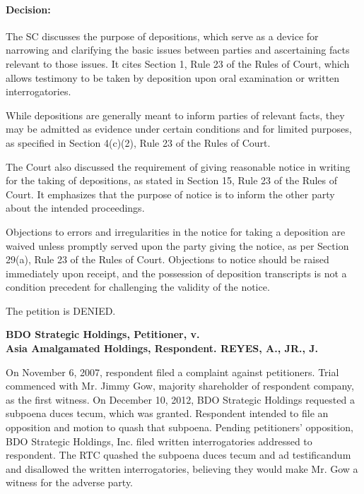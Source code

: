 \documentclass[
12pt,
oneside,
onehalfspacing,
headsepline
]{DigestCollection}
\begin{document}
\paragraph{Decision:}
\label{eec357d0-09fd-11ef-932c-63c852f65e48}


The SC discusses the purpose of depositions, which serve as a device for narrowing and clarifying the basic issues between parties and ascertaining facts relevant to those issues. It cites Section 1, Rule 23 of the Rules of Court, which allows testimony to be taken by deposition upon oral examination or written interrogatories.

While depositions are generally meant to inform parties of relevant facts, they may be admitted as evidence under certain conditions and for limited purposes, as specified in Section 4(c)(2), Rule 23 of the Rules of Court.

The Court also discussed the requirement of giving reasonable notice in writing for the taking of depositions, as stated in Section 15, Rule 23 of the Rules of Court. It emphasizes that the purpose of notice is to inform the other party about the intended proceedings.

Objections to errors and irregularities in the notice for taking a deposition are waived unless promptly served upon the party giving the notice, as per Section 29(a), Rule 23 of the Rules of Court. Objections to notice should be raised immediately upon receipt, and the possession of deposition transcripts is not a condition precedent for challenging the validity of the notice. 

The petition is DENIED. 

\label{159efc30-0a10-11ef-932c-63c852f65e48}


\noindent\textbf{BDO Strategic Holdings, Petitioner, v. \\ Asia Amalgamated Holdings, Respondent. REYES, A., JR., J.}\vspace{0.4cm}

On November 6, 2007, respondent filed a complaint against petitioners. Trial commenced with Mr. Jimmy Gow, majority shareholder of respondent company, as the first witness. On December 10, 2012, BDO Strategic Holdings requested a subpoena duces tecum, which was granted. Respondent intended to file an opposition and motion to quash that subpoena. Pending petitioners' opposition, BDO Strategic Holdings, Inc. filed written interrogatories addressed to respondent. The RTC quashed the subpoena duces tecum and ad testificandum and disallowed the written interrogatories, believing they would make Mr. Gow a witness for the adverse party.
\end{document}
